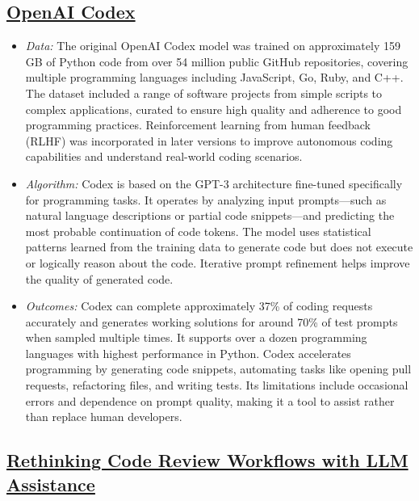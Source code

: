 \documentclass[12pt,a4paper]{article}
\begin{document}
\subsection{\href{https://github.com/openai/codex}{OpenAI Codex}}

\begin{itemize}[leftmargin=1.5em]
    \item \textit{Data:} The original OpenAI Codex model was trained on approximately 159 GB of Python code from over 54 
    million public GitHub repositories, covering multiple programming languages including JavaScript, Go, Ruby, and C++. 
    The dataset included a range of software projects from simple scripts to complex applications, curated to ensure 
    high quality and adherence to good programming practices. Reinforcement learning from human feedback (RLHF) was 
    incorporated in later versions to improve autonomous coding capabilities and understand real-world coding scenarios.
    \item \textit{Algorithm:} Codex is based on the GPT-3 architecture fine-tuned specifically for programming tasks. It 
    operates by analyzing input prompts—such as natural language descriptions or partial code snippets—and predicting 
    the most probable continuation of code tokens. The model uses statistical patterns learned from the training data to 
    generate code but does not execute or logically reason about the code. Iterative prompt refinement helps improve the 
    quality of generated code.
    \item \textit{Outcomes:} Codex can complete approximately 37\% of coding requests accurately and generates working 
    solutions for around 70\% of test prompts when sampled multiple times. It supports over a dozen programming 
    languages with highest performance in Python. Codex accelerates programming by generating code snippets, automating 
    tasks like opening pull requests, refactoring files, and writing tests. Its limitations include occasional errors 
    and dependence on prompt quality, making it a tool to assist rather than replace human developers.
\end{itemize}

\subsection{\href{https://arxiv.org/abs/2505.16339}{Rethinking Code Review Workflows with LLM Assistance}}
\end{document}
